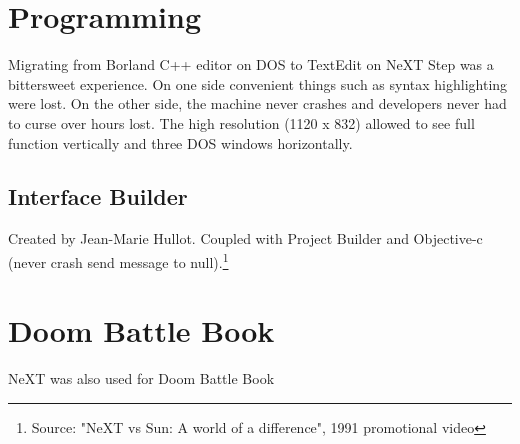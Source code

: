 
\section{Programming}
Migrating from Borland C++ editor on DOS to TextEdit on NeXT Step was a bittersweet experience. On one side convenient things such as syntax highlighting were lost. On the other side, the machine never crashes and developers never had to curse over hours lost. The high resolution (1120 x 832) allowed to see full function vertically and three DOS windows horizontally. \\
\par
{}
\par
{}

\subsection{Interface Builder}
Created by Jean-Marie Hullot. Coupled with Project Builder and Objective-c (never crash send message to null).\footnote{Source: "NeXT vs Sun: A world of a difference", 1991 promotional video}

\section{Doom Battle Book}
NeXT was also used for Doom Battle Book\\
